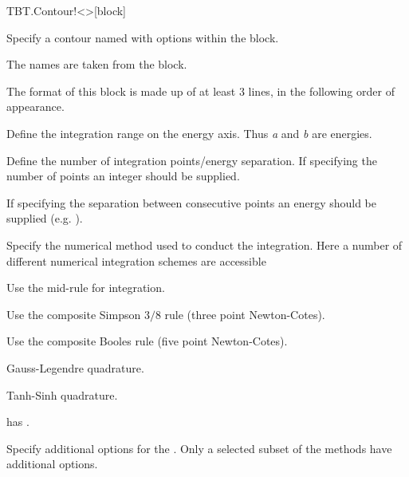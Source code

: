 \begin{fdfentry}{TBT.Contour!<>}[block]

  Specify a contour named \fdf*{<>} with options within the block.

  The names \fdf*{<>} are taken from the  block.

  The format of this block is made up of at least $3$ lines, in the
  following order of appearance.

  \begin{fdfoptions}


    Define the integration range on the energy axis.
    Thus \emph{a} and \emph{b} are energies.



    Define the number of integration points/energy separation.
    If specifying the number of points an integer should be supplied.

    If specifying the separation between consecutive points an energy
    should be supplied (e.g. ).

    \option[method]%

    Specify the numerical method used to conduct the integration. Here
    a number of different numerical integration schemes are accessible

    \begin{fdfoptions}
      Use the mid-rule for integration.

      Use the composite Simpson $3/8$ rule (three point Newton-Cotes).

      Use the composite Booles rule (five point Newton-Cotes).
 
      \option[G-legendre]%
      Gauss-Legendre quadrature.

      Tanh-Sinh quadrature.

      \note has .

    \end{fdfoptions}

    \option[opt]%

    Specify additional options for the . Only a selected
    subset of the methods have additional options.

  \end{fdfoptions}

\end{fdfentry}

